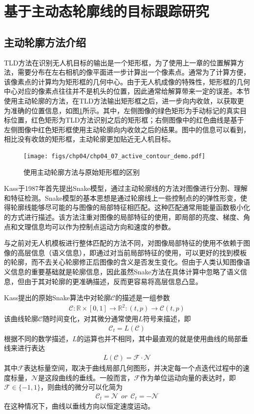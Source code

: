 \section{基于主动态轮廓线的目标跟踪研究}
\subsection{主动轮廓方法介绍}
TLD方法在识别无人机目标的输出是一个矩形框，为了使用上一章的位置解算方法，需要分布在左右相机的像平面进一步计算出一个像素点。通常为了计算方便，该像素点的计算均为矩形框的几何中心。由于无人机成像的特殊性，矩形框的几何中心对应的像素点往往并不是机头的位置，因此通常给解算带来一定的误差。本节使用主动轮廓的方法，在TLD方法输出矩形框之后，进一步向内收敛，以获取更为准确的位置信息，如图\ref{fig:chp04_07_active_contour_demo}所示。其中，左侧图像的绿色矩形为手动标记的真实目标位置，红色矩形为TLD方法识别之后的矩形框；右侧图像中的红色曲线是基于左侧图像中红色矩形框使用主动轮廓向内收敛之后的结果。图中的信息可以看到，相比没有收敛的矩形框，主动轮廓更加贴近无人机目标。

\begin{figure}[ht]   
	\centering
	\texttt{[image: figs/chp04/chp04\_07\_active\_contour\_demo.pdf]}
	\caption{使用主动轮廓方法与原始矩形框的区别}
	\label{fig:chp04_07_active_contour_demo}
\end{figure}

Kass于1987年首先提出Snake模型\cite{kass1988snakes}，通过主动轮廓线的方法对图像进行分割、理解和特征检测。Snake模型的基本思想是通过轮廓线上一些控制点的的弹性形变，使得轮廓线能够尽可能的与图像的局部特征相匹配。这种匹配通常用能量函数极小化的方式进行描述。该方法注重对图像的局部特征的使用，即局部的亮度、梯度、角点和文理信息均可以作为控制点运动方向和速度的参数。

与之前对无人机模板进行整体匹配的方法不同，对图像局部特征的使用不依赖于图像的高层信息（语义信息），即通过对当前局部特征的使用，可以更好的找到模板的轮廓，而不去关心轮廓修正后图像的含义是否发生变化。但由于人类认知图像语义信息的重要基础就是轮廓信息，因此虽然Snake方法在具体计算中忽略了语义信息，但由于其对轮廓的更准确描述，反而更容易将高层信息凸显。

Kass提出的原始Snake算法中对轮廓$\mathcal{C}$的描述是一组参数
\begin{align}
\mathcal{C}:\mathbb{R} \times [0,1] \rightarrow \mathbb{R}^2:(t,p) \rightarrow \mathcal{C}(t,p)
\end{align}
该曲线轮廓$\mathcal{C}$随时间变化，对其微分通常使用$L$符号来描述，即
\begin{align}
\mathcal{C}_t =L(\mathcal{C})
\end{align}
根据不同的数学描述，$L$的运算也并不相同，其中最直观的就是使用曲线的局部垂线来进行表达
\begin{align}
L(\mathcal{C}) = \mathcal{F} \cdot \mathcal{N}
\end{align}
其中$\mathcal{F}$表达标量空间，取决于曲线局部几何图形，并决定每一个点迭代过程中的速度标量，$\mathcal{N}$是这段曲线的垂线。一般而言，$\mathcal{F}$作为单位运动向量的表达时，即$\mathcal{F} \in \{-1, 1\}$，则曲线的微分可以化简为
\begin{align}
\mathcal{C}_t = \mathcal{N}\ \ or\  \ \mathcal{C}_t= -\mathcal{N}
\end{align}
在这种情况下，曲线以垂线方向以恒定速度运动。

